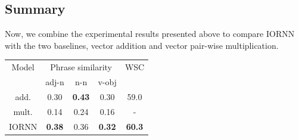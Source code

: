 \documentclass[11pt]{article}
\begin{document}

\subsection{Summary} 

Now, we combine the experimental results presented above to compare IORNN 
with the two baselines, vector addition and vector pair-wise multiplication.

\begin{table}[!ht]
	\center
	\begin{tabular}{ccccc}
	Model & \multicolumn{3}{c}{Phrase similarity} & WSC \\ 
	& adj-n & n-n & v-obj & \\ \hline
	
	add. & 0.30 & \textbf{0.43} & 0.30 & 59.0\\ 
	mult. & 0.14 & 0.24 & 0.16 & - \\ 
	IORNN & \textbf{0.38} & 0.36 & \textbf{0.32} & \textbf{60.3} \\ \hline
	
	\end{tabular}
\end{table}




\end{document}
